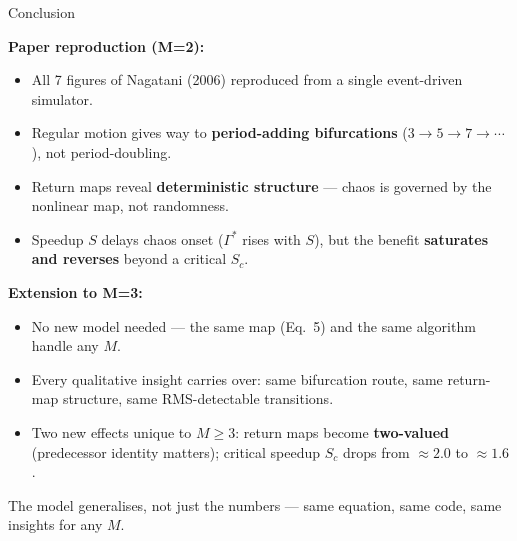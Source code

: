 \documentclass[t, aspectratio=169]{beamer}
\begin{document}
\begin{frame}{Conclusion}
	\footnotesize
	\setlength{\itemsep}{1pt}

	\textbf{Paper reproduction (M=2):}
	\begin{itemize}\setlength{\itemsep}{1pt}
		\item All 7 figures of Nagatani (2006) reproduced from a single event-driven simulator.
		\item Regular motion gives way to \textbf{period-adding bifurcations} ($3\to5\to7\to\cdots$), not period-doubling.
		\item Return maps reveal \textbf{deterministic structure} — chaos is governed by the nonlinear map, not randomness.
		\item Speedup $S$ delays chaos onset ($\Gamma^*$ rises with $S$), but the benefit \textbf{saturates and reverses} beyond a critical $S_c$.
	\end{itemize}

	\vspace{0.2em}
	\textbf{Extension to M=3:}
	\begin{itemize}\setlength{\itemsep}{1pt}
		\item \alert{No new model needed} — the same map (Eq.~5) and the same algorithm handle any $M$.
		\item Every qualitative insight carries over: same bifurcation route, same return-map structure, same RMS-detectable transitions.
		\item Two new effects unique to $M\geq3$: return maps become \textbf{two-valued} (predecessor identity matters); critical speedup $S_c$ drops from $\approx2.0$ to $\approx1.6$.
	\end{itemize}

	\vspace{0.15em}
	\alert{The model generalises, not just the numbers} — same equation, same code, same insights for any $M$.
\end{frame}


\hustthankyou
\end{document}
